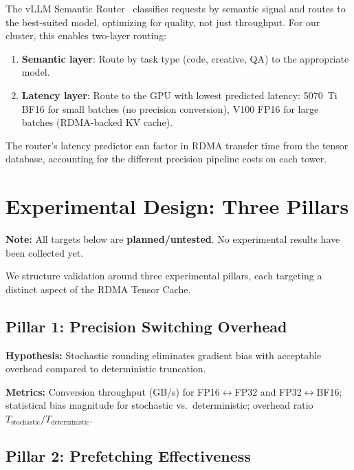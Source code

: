 \documentclass[11pt,letterpaper]{article}
\theoremstyle{definition}
\begin{document}
The vLLM Semantic Router~\cite{vllm-semantic-router} classifies requests by semantic signal and routes to the best-suited model, optimizing for quality, not just throughput. For our cluster, this enables two-layer routing:
\begin{enumerate}
    \item \textbf{Semantic layer}: Route by task type (code, creative, QA) to the appropriate model.
    \item \textbf{Latency layer}: Route to the GPU with lowest predicted latency: 5070~Ti BF16 for small batches (no precision conversion), V100 FP16 for large batches (RDMA-backed KV cache).
\end{enumerate}
The router's latency predictor can factor in RDMA transfer time from the tensor database, accounting for the different precision pipeline costs on each tower.

\section{Experimental Design: Three Pillars}
\label{sec:experiments}

\textbf{Note:} All targets below are \textbf{planned/untested}. No experimental results have been collected yet.

We structure validation around three experimental pillars, each targeting a distinct aspect of the RDMA Tensor Cache.

\subsection{Pillar 1: Precision Switching Overhead}

\textbf{Hypothesis:} Stochastic rounding eliminates gradient bias with acceptable overhead compared to deterministic truncation.

\textbf{Metrics:} Conversion throughput (GB/s) for FP16$\leftrightarrow$FP32 and FP32$\leftrightarrow$BF16; statistical bias magnitude for stochastic vs.\ deterministic; overhead ratio $T_{\text{stochastic}} / T_{\text{deterministic}}$.

\subsection{Pillar 2: Prefetching Effectiveness}
\end{document}
